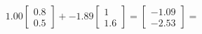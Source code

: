 \documentclass[preview]{standalone}
\begin{document}
\begin{align*}
1.00 \begin{bmatrix} 0.8 \\ 0.5 \end{bmatrix} + -1.89 \begin{bmatrix} 1 \\ 1.6 \end{bmatrix} = \begin{bmatrix} -1.09 \\ -2.53 \end{bmatrix} =
\end{align*}
\end{document}
